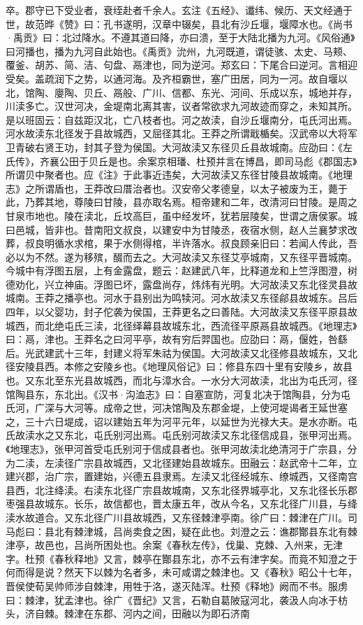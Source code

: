 \documentclass[12pt,UTF8]{ctexbook}
\begin{document}
卒。郡守已下受业者，衰绖赴者千余人。玄注《五经》、谶纬、候历、天文经通于世，故范晔《赞》曰：孔书遂明，汉章中辍矣，县北有沙丘堰，堰障水也。《尚书·禹贡》曰：北过降水。不遵其道曰降，亦曰溃，至于大陆北播为九河。《风俗通》曰河播也，播为九河自此始也。《禹贡》沇州，九河既道，谓徒骇、太史、马颊、覆釜、胡苏、简、洁、句盘、鬲津也，同为逆河。郑玄曰：下尾合曰逆河。言相迎受矣。盖疏润下之势，以通河海。及齐桓霸世，塞广田居，同为一河。故自堰以北，馆陶、廮陶、贝丘、鬲般、广川、信都、东光、河间、乐成以东，城地并存，川渎多亡。汉世河决，金堤南北离其害，议者常欲求九河故迹而穿之，未知其所。是以班固云：自兹距汉北，亡八枝者也。河之故渎，自沙丘堰南分，屯氏河出焉。河水故渎东北径发于县故城西，又屈径其北。王莽之所谓戢楯矣。汉武帝以大将军卫青破右贤王功，封其子登为侯国。大河故渎又东径贝丘县故城南。应劭曰：《左氏传》，齐襄公田于贝丘是也。余案京相璠、杜预并言在博昌，即司马彪《郡国志》所谓贝中聚者也。应《注》于此事近违矣，大河故渎又东径甘陵县故城南。《地理志》之所谓盾也，王莽改曰厝治者也。汉安帝父孝德皇，以太子被废为王，薨于此，乃葬其地，尊陵曰甘陵，县亦取名焉。桓帝建和二年，改清河曰甘陵。是周之甘泉市地也。陵在渎北，丘坟高巨，虽中经发坏，犹若层陵矣，世谓之唐侯冢。城曰邑城，皆非也。昔南阳文叔良，以建安中为甘陵丞，夜宿水侧，赵人兰襄梦求改葬，叔良明循水求棺，果于水侧得棺，半许落水。叔良顾亲旧曰：若闻人传此，吾必以为不然。遂为移殡，醊而去之。大河故渎又东径艾亭城南，又东径平晋城南。今城中有浮图五层，上有金露盘，题云：赵建武八年，比释道龙和上竺浮图澄，树德劝化，兴立神庙。浮图已坏，露盘尚存，炜炜有光明。大河故渎又东北径灵县故城南。王莽之播亭也。河水于县别出为鸣犊河。河水故渎又东径鄃县故城东。吕后四年，以父婴功，封子佗袭为侯国，王莽更名之曰善陆。大河故渎又东径平原县故城西，而北绝屯氏三渎，北径绎幕县故城东北，西流径平原鬲县故城西。《地理志》曰：鬲，津也。王莽名之曰河平亭，故有穷后羿国也。应劭曰：鬲，偃姓，咎繇后。光武建武十三年，封建义将军朱祜为侯国。大河故渎又北径修县故城东，又北径安陵县西。本修之安陵乡也。《地理风俗记》曰：修县东四十里有安陵乡，故县也。又东北至东光县故城西，而北与漳水合。一水分大河故渎，北出为屯氏河，径馆陶县东，东北出。《汉书·沟洫志》曰：自塞宣防，河复北决于馆陶县，分为屯氏河，广深与大河等。成帝之世，河决馆陶及东郡金堤，上使河堤谒者王延世塞之，三十六日堤成，诏以建始五年为河平元年，以延世为光禄大夫。是水亦断。屯氏故渎水之又东北，屯氏别河出焉。屯氏别河故渎又东北径信成县，张甲河出焉。《地理志》，张甲河首受屯氏别河于信成县者也。张甲河故渎北绝清河于广宗县，分为二渎，左渎径广宗县故城西，又北径建始县故城东。田融云：赵武帝十二年，立建兴郡，治广宗，置建始，兴德五县隶焉。左渎又北径经城东、缭城西，又径南宫县西，北注绛渎。右渎东北径广宗县故城南，又东北径界城亭北，又东北径长乐郡枣强县故城东。长乐，故信都也，晋太康五年，改从今名，又东北径广川县，与绛渎水故道合。又东北径广川县故城西，又东径棘津亭南。徐广曰：棘津在广川。司马彪曰：县北有棘津城，吕尚卖食之困，疑在此也。刘澄之云：谯郡酇县东北有棘津亭，故邑也，吕尚所困处也。余案《春秋左传》，伐巢、克棘、入州来，无津字。杜预《春秋释地》又言，棘亭在酇县东北，亦不云有津字矣。而竟不知澄之于何而得是说？然天下以棘为名者多，未可咸谓之棘津也。又《春秋》昭公十七年，晋侯使荀吴帅师涉自棘津，用牲于洛，遂灭陆浑。杜预《释地》阙而不书。服虏曰：棘津，犹孟津也。徐广《晋纪》又言，石勒自葛陂寇河北，袭汲人向冰于枋头，济自棘。棘津在东郡、河内之间，田融以为即石济南
\end{document}
